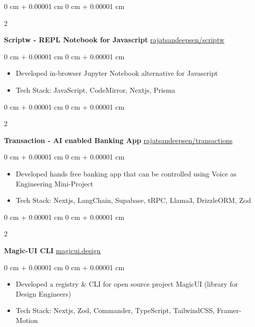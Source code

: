 \documentclass[10pt, letterpaper]{article}
\newenvironment{highlights}{
    \begin{itemize}[
        topsep=0.10 cm,
        parsep=0.10 cm,
        partopsep=0pt,
        itemsep=0pt,
        leftmargin=0 cm + 10pt
    ]
}{
    \end{itemize}
} %
\newenvironment{onecolentry}{
    \begin{adjustwidth}{
        0 cm + 0.00001 cm
    }{
        0 cm + 0.00001 cm
    }
}{
    \end{adjustwidth}
} %
\newenvironment{twocolentry}[2][]{
    \onecolentry
    \def\secondColumn{#2}
    \setcolumnwidth{\fill, 4.5 cm}
    \begin{paracol}{2}
}{
    \switchcolumn \raggedleft \secondColumn
    \end{paracol}
    \endonecolentry
} %
\begin{document}
\begin{twocolentry}{
		\href{https://github.com/rajatsandeepsen/scriptw}{rajatsandeepsen/scriptw}
	}
	\textbf{Scriptw - REPL Notebook for Javascript}\end{twocolentry}

\vspace{0.10 cm}
\begin{onecolentry}
	\begin{highlights}
		\item Developed in-browser Jupyter Notebook alternative for Javascript
		\item Tech Stack: JavaScript, CodeMirror, Nextjs, Prisma
	\end{highlights}
\end{onecolentry}
\vspace{0.2 cm}

\begin{twocolentry}{
		\href{https://github.com/rajatsandeepsen/transactions}{rajatsandeepsen/transactions}
	}
	\textbf{Transaction - AI enabled Banking App}\end{twocolentry}

\vspace{0.10 cm}
\begin{onecolentry}
	\begin{highlights}
		\item Developed hands free banking app that can be controlled using Voice as
		Engineering Mini-Project
		\item Tech Stack: Nextjs, LangChain, Supabase, tRPC, Llama3, DrizzleORM, Zod
	\end{highlights}
\end{onecolentry}
\vspace{0.2 cm}

\begin{twocolentry}{
		\href{https://magicui.design/}{magicui.design}
	}
	\textbf{Magic-UI CLI}\end{twocolentry}

\vspace{0.10 cm}
\begin{onecolentry}
	\begin{highlights}
		\item Developed a registry \& CLI for open source project MagicUI (library for Design
		Engineers)
		\item Tech Stack: Nextjs, Zod, Commander, TypeScript, TailwindCSS, Framer-Motion
	\end{highlights}
\end{onecolentry}
\end{document}
